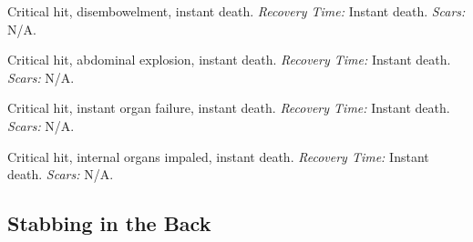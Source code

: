 \documentclass[12pt]{book}  %
\begin{document}
\begin{description}[labelwidth=1.5em, leftmargin=*, itemsep=0.4em]
    \item[17 -] Critical hit, disembowelment, instant death. \textit{Recovery Time:} Instant death. \textit{Scars:} N/A.
    \item[18 -] Critical hit, abdominal explosion, instant death. \textit{Recovery Time:} Instant death. \textit{Scars:} N/A.
    \item[19 -] Critical hit, instant organ failure, instant death. \textit{Recovery Time:} Instant death. \textit{Scars:} N/A.
    \item[20 -] Critical hit, internal organs impaled, instant death. \textit{Recovery Time:} Instant death. \textit{Scars:} N/A.
\end{description}

\subsection{Stabbing in the Back}
\end{document}
